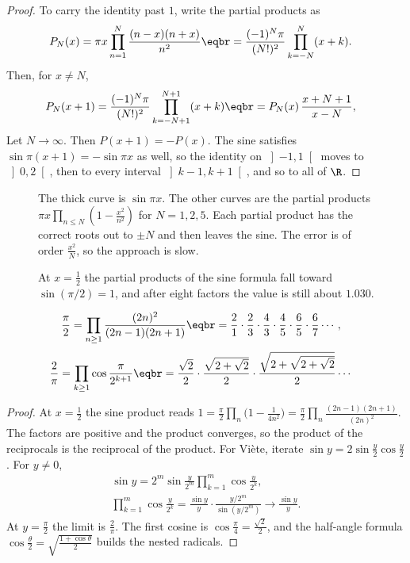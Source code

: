 \begin{proof}
To carry the identity past $1$, write the partial products as
\[
\begin{aligned}P_N(x)&=\pi x\prod_{n=1}^N\frac{(n-x)(n+x)}{n^2}\eqbr=\frac{(-1)^N\pi}{(N!)^2}\prod_{k=-N}^N(x+k).\end{aligned}
\]
Then, for $x\ne N$,
\[
\begin{aligned}P_N(x+1)&=\frac{(-1)^N\pi}{(N!)^2}\prod_{k=-N+1}^{N+1}(x+k)\eqbr=P_N(x)\,\frac{x+N+1}{x-N},\end{aligned}
\]
Let $N\to\infty$. Then $P(x+1)=-P(x)$. The sine satisfies $\sin\pi(x+1)=-\sin\pi x$ as well, so the identity on $\left]-1,1\right[$ moves to $\left]0,2\right[$, then to every interval $\left]k-1,k+1\right[$, and so to all of $\R$.
\end{proof}

\begin{figure}[ht]
\centering
{}
\caption{The thick curve is $\sin\pi x$. The other curves are the partial products $\pi x\prod_{n\le N}(1-\frac{x^2}{n^2})$ for $N=1,2,5$. Each partial product has the correct roots out to $\pm N$ and then leaves the sine. The error is of order $\frac{x^2}N$, so the approach is slow.}
\label{fig:sineproduct}
\end{figure}

\begin{figure}[ht]
\centering
{}
\caption{At $x=\frac12$ the partial products of the sine formula fall toward $\sin(\pi/2)=1$, and after eight factors the value is still about $1.030$.}
\label{fig:rw03-partial}
\end{figure}

\begin{corollary}\label{cor:wallis}
\[
\begin{aligned}\frac\pi2&=\prod_{n\ge1}\frac{(2n)^2}{(2n-1)(2n+1)}\eqbr=\frac21\cdot\frac23\cdot\frac43\cdot\frac45\cdot\frac65\cdot\frac67\cdots,\end{aligned}
\]
\[
\begin{aligned}\frac2\pi&=\prod_{k\ge1}\cos\frac\pi{2^{k+1}}\eqbr=\frac{\sqrt2}2\cdot\frac{\sqrt{2+\sqrt2}}2\cdot\frac{\sqrt{2+\sqrt{2+\sqrt2}}}2\cdots\end{aligned}
\]
\end{corollary}
\begin{proof}
At $x=\frac12$ the sine product reads $1=\frac\pi2\prod_n\bigl(1-\frac1{4n^2}\bigr)=\frac\pi2\prod_n\frac{(2n-1)(2n+1)}{(2n)^2}$. The factors are positive and the product converges, so the product of the reciprocals is the reciprocal of the product. For Vi\`ete, iterate $\sin y=2\sin\frac y2\cos\frac y2$. For $y\ne0$,
\[
\begin{gathered}\sin y=2^m\sin\frac y{2^m}\prod_{k=1}^m\cos\frac y{2^k},\\\prod_{k=1}^m\cos\frac y{2^k}=\frac{\sin y}{y}\cdot\frac{y/2^m}{\sin(y/2^m)}\to\frac{\sin y}y.\end{gathered}
\]
At $y=\frac\pi2$ the limit is $\frac2\pi$. The first cosine is $\cos\frac\pi4=\frac{\sqrt2}2$, and the half-angle formula $\cos\frac\theta2=\sqrt{\frac{1+\cos\theta}2}$ builds the nested radicals.
\end{proof}

